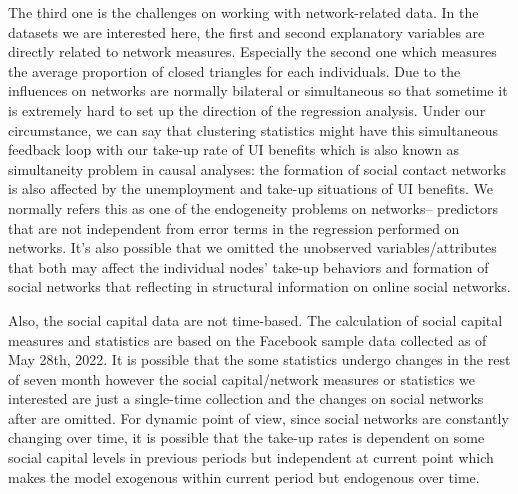 \documentclass{article}
\begin{document}
The third one is the challenges on working with network-related data. In the datasets we are interested here, the first and second explanatory variables are directly related to network measures. Especially the second one which measures the average proportion of closed triangles for each individuals. Due to the influences on networks are normally bilateral or simultaneous so that sometime it is extremely hard to set up the direction of the regression analysis. Under our circumstance, we can say that clustering statistics might have this simultaneous feedback loop with our take-up rate of UI benefits which is also known as simultaneity problem in causal analyses: the formation of social contact networks is also affected by the unemployment and take-up situations of UI benefits.  We normally refers this as one of the endogeneity problems on networks-- predictors that are not independent from error terms in the regression performed on networks. It's also possible that we omitted the unobserved variables/attributes that both may affect the individual nodes' take-up behaviors and formation of social networks that reflecting in structural information on online social networks.

Also, the social capital data are not time-based. The calculation of social capital measures and statistics are based on the Facebook sample data collected as of May 28th, 2022. It is possible that the some statistics undergo changes in the rest of seven month however the social capital/network measures or statistics we interested are just a single-time collection and the changes on social networks after are omitted. For dynamic point of view, since social networks are constantly changing over time, it is possible that the take-up rates is dependent on some social capital levels in previous periods but independent at current point which makes the model exogenous within current period but endogenous over time. 



\newpage

\printbibliography
\end{document}
